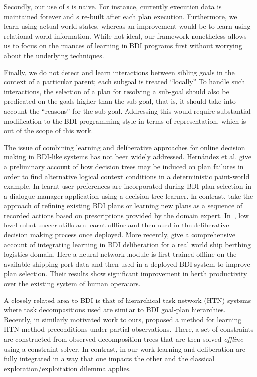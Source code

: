 Secondly, our use of \dt s is naive. 
For instance, currently execution data is maintained forever and 
\dt s re-built after each plan execution. Furthermore, we learn using actual 
world states, whereas an improvement would be to learn using relational world information.
While not ideal, our framework nonetheless allows us to focus on 
the nuances of learning in BDI programs first 
without worrying about the underlying techniques.

Finally, we do not detect and learn interactions between
sibling goals in the context of a particular parent; each
subgoal is treated ``locally.'' To handle such interactions, the
selection of a plan for resolving a sub-goal should also be predicated
on the goals higher than the sub-goal, that is, it should take into
account the ``reasons'' for the sub-goal. Addressing this would require substantial modification to the BDI programming style in terms of representation, which is out of the scope of this work.

The issue of combining learning and deliberative approaches for online 
decision making in BDI-like systems has not been widely addressed.
%
Hern\'andez et al. \cite{Hernandez04:Learning} give a preliminary
account of how decision trees may be induced on plan failures in order
to find alternative logical context conditions in a deterministic
paint-world example. 
%
In \cite{nguyen2006an-ad} learnt user preferences are incorporated during BDI plan selection in a dialogue manager application using a decision tree learner. %
In contrast, \cite{karim2006plans} take the approach of refining existing BDI plans or learning new plans as a sequence of recorded actions based on prescriptions provided by the domain expert.
%
In~\cite{Riedmiller01}, low level robot soccer skills are learnt offline and then used in the deliberative decision making process once deployed.
%
More recently, \cite{lokuge2007impro} give a comprehensive account of integrating learning in BDI deliberation for a real world ship berthing logistics domain. Here a neural network module is first trained offline on the available shipping port data and then used in a deployed BDI system to improve plan selection. Their results show significant improvement in berth productivity over the existing system of human operators.

A closely related area to BDI is that of hierarchical task network (HTN)
systems where task decompositions used are similar to BDI goal-plan hierarchies.
Recently, in similarly motivated work to ours, \cite{Zhuo09:Learning} 
proposed a method for learning HTN method preconditions under partial
observations. There, a set of constraints are constructed from
observed decomposition trees that are then solved \emph{offline} using
a constraint solver.
%
In contrast, in our work learning and deliberation are fully integrated in a
way that one impacts the other and the classical
exploration/exploitation dilemma applies. 

